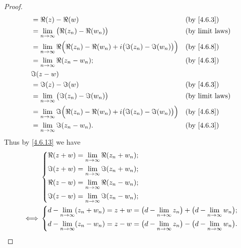 \begin{proof}
\begin{align*}
     & = \Re(z) - \Re(w)                                                                        &  & \text{(by \cref{4.6.3})} \\
     & = \lim_{n \to \infty} \big(\Re(z_n) - \Re(w_n)\big)                                      &  & \text{(by limit laws)}   \\
     & = \lim_{n \to \infty} \Re\Big(\Re(z_n) - \Re(w_n) + i \big(\Im(z_n) - \Im(w_n)\big)\Big) &  & \text{(by \cref{4.6.8})} \\
     & = \lim_{n \to \infty} \Re(z_n - w_n);                                                    &  & \text{(by \cref{4.6.3})} \\
     & \Im(z - w)                                                                                                             \\
     & = \Im(z) - \Im(w)                                                                        &  & \text{(by \cref{4.6.3})} \\
     & = \lim_{n \to \infty} \big(\Im(z_n) - \Im(w_n)\big)                                      &  & \text{(by limit laws)}   \\
     & = \lim_{n \to \infty} \Im\Big(\Re(z_n) - \Re(w_n) + i \big(\Im(z_n) - \Im(w_n)\big)\Big) &  & \text{(by \cref{4.6.8})} \\
     & = \lim_{n \to \infty} \Im(z_n - w_n).                                                    &  & \text{(by \cref{4.6.3})} \\
  \end{align*}
  Thus by \cref{4.6.13} we have
  \begin{align*}
         & \begin{dcases}
             \Re(z + w) = \lim_{n \to \infty} \Re(z_n + w_n); \\
             \Im(z + w) = \lim_{n \to \infty} \Im(z_n + w_n); \\
             \Re(z - w) = \lim_{n \to \infty} \Re(z_n - w_n); \\
             \Im(z - w) = \lim_{n \to \infty} \Im(z_n - w_n);
           \end{dcases}                                                                             \\
    \iff & \begin{dcases}
             d - \lim_{n \to \infty} (z_n + w_n) = z + w = \big(d - \lim_{n \to \infty} z_n\big) + \big(d - \lim_{n \to \infty} w_n\big); \\
             d - \lim_{n \to \infty} (z_n - w_n) = z - w = \big(d - \lim_{n \to \infty} z_n\big) - \big(d - \lim_{n \to \infty} w_n\big).
           \end{dcases}
  \end{align*}


\end{proof}
